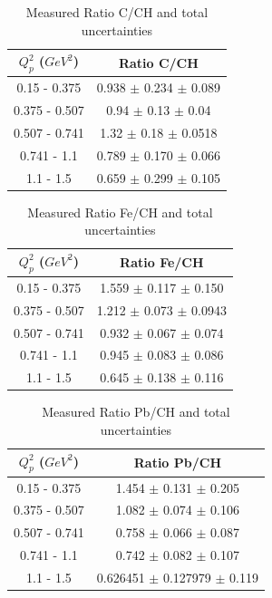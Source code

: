 \begin{table}[ht]
\begin{center}
    \begin{tabular}{c|c}
     \hline
\hline
    $Q^{2}_{p}$ ($GeV^2$) & Ratio C/CH \\  
\hline
    0.15 - 0.375 & 0.938 $\pm$ 0.234 $\pm$ 0.089 \\  
    0.375 - 0.507 & 0.94 $\pm$ 0.13 $\pm$ 0.04\\  
    0.507 - 0.741 & 1.32 $\pm$ 0.18 $\pm$ 0.0518\\  
    0.741 - 1.1 & 0.789 $\pm$ 0.170 $\pm$ 0.066\\  
    1.1 - 1.5 & 0.659 $\pm$ 0.299 $\pm$ 0.105\\  
     \hline
\hline
    \end{tabular}
\caption{Measured Ratio C/CH and total uncertainties }
\end{center}
\end{table}

\begin{table}[ht]
\begin{center}
    \begin{tabular}{c|c}
     \hline
\hline
    $Q^{2}_{p}$ ($GeV^2$) & Ratio Fe/CH \\  
\hline
    0.15 - 0.375 & 1.559 $\pm$ 0.117 $\pm$ 0.150 \\  
    0.375 - 0.507 & 1.212 $\pm$ 0.073 $\pm$ 0.0943\\  
    0.507 - 0.741 & 0.932 $\pm$ 0.067 $\pm$ 0.074\\  
    0.741 - 1.1 & 0.945 $\pm$ 0.083 $\pm$ 0.086\\  
    1.1 - 1.5 & 0.645 $\pm$ 0.138 $\pm$ 0.116\\  
     \hline
\hline
    \end{tabular}
\caption{Measured Ratio Fe/CH and total uncertainties }
\end{center}
\end{table}

\begin{table}[ht]
\begin{center}
    \begin{tabular}{c|c}
     \hline
\hline
    $Q^{2}_{p}$ ($GeV^2$) & Ratio Pb/CH  \\  
\hline
    0.15 - 0.375 & 1.454 $\pm$ 0.131 $\pm$ 0.205 \\  
    0.375 - 0.507 & 1.082 $\pm$ 0.074 $\pm$ 0.106\\  
    0.507 - 0.741 & 0.758 $\pm$ 0.066 $\pm$ 0.087\\  
    0.741 - 1.1 & 0.742 $\pm$ 0.082 $\pm$ 0.107\\  
    1.1 - 1.5 & 0.626451 $\pm$ 0.127979 $\pm$ 0.119\\  
     \hline
\hline
    \end{tabular}
\caption{Measured Ratio Pb/CH and total uncertainties }
\end{center}
\end{table}

